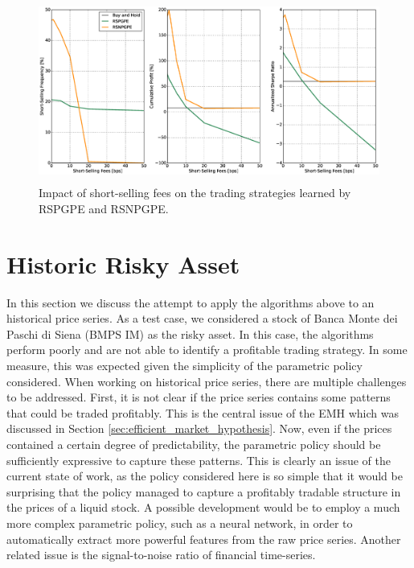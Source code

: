 \begin{figure}[t!]
\centering
\includegraphics[height=6cm,width=1\linewidth]{Images/8_7_impact_short_selling_fees_RS}
\caption[Short-selling fees and risk-sensitive strategies]{Impact of short-selling fees on the trading strategies learned by RSPGPE and RSNPGPE.}
\label{fig:8_7_impact_short_selling_fees_RS}
\end{figure}

\clearpage
\section{Historic Risky Asset}
In this section we discuss the attempt to apply the algorithms above to an historical price series. As a test case, we considered a stock of Banca Monte dei Paschi di Siena (BMPS IM) as the risky asset. In this case, the algorithms perform poorly and are not able to identify a profitable trading strategy. In some measure, this was expected given the simplicity of the parametric policy considered. When working on historical price series, there are multiple challenges to be addressed. First, it is not clear if the price series contains some patterns that could be traded profitably. This is the central issue of the \gls{EMH} which was discussed in Section \ref{sec:efficient_market_hypothesis}. Now, even if the prices contained a certain degree of predictability, the parametric policy should be sufficiently expressive to capture these patterns. This is clearly an issue of the current state of work, as the policy considered here is so simple that it would be surprising that the policy managed to capture a profitably tradable structure in the prices of a liquid stock. A possible development would be to employ a much more complex parametric policy, such as a neural network, in order to automatically extract more powerful features from the raw price series. Another related issue is the signal-to-noise ratio of financial time-series. 


